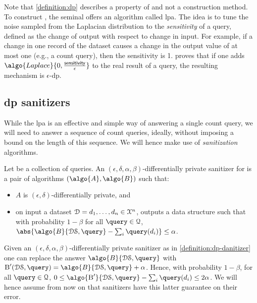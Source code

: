 		Note that \cref{definition:dp} describes a property of  and not a construction method.
		To construct , the seminal \cite{differential-privacy-original} offers an algorithm called \acrfull{lpa}.
		The idea is to tune the noise sampled from the Laplacian distribution to the \emph{sensitivity} of a query, defined as the change of output with respect to change in input.
		For example, if a change in one record of the dataset causes a change in the output value of at most one (e.g., a count query), then the sensitivity is 1.
		\cite{differential-privacy-original} proves that if one adds $\algo{Laplace}{0, \frac{\mathsf{sensitivity}}{\epsilon}}$ to the real result of a query, the resulting mechanism is $\epsilon$-\acrshort{dp}.

		\subsection{\texorpdfstring{\acrshort{dp}}{DP} sanitizers}\label{section:background:dp-sanitizers}

			While the \acrlong{lpa} is an effective and simple way of answering a single count query, we will need to answer a sequence of count queries, ideally, without imposing a bound on the length of this sequence.
			We will hence make use of \emph{sanitization} algorithms.

			\begin{definition}\label{definition:dp-danitizer}
				Let \querySet{} be a collection of queries.
				An $(\epsilon, \delta, \alpha, \beta)$-differentially private sanitizer for \querySet{} is a pair of algorithms $(\algo{A}, \algo{B})$ such that:
				\begin{itemize}
					\item $A$ is $(\epsilon, \delta)$-differentially private, and
					\item on input a dataset $\mathcal{D} = d_1, \ldots, d_{n} \in \mathcal{X}^{n}$,  outputs a data structure \serverDS{} such that with probability $1 - \beta$ for all $\query \in \querySet$, $\abs{ \algo{B}{ \serverDS, \query } - \sum_i \query(d_i) } \leq \alpha$.
				\end{itemize}
			\end{definition}

			\begin{remark}\label{remark:dp-sanitizer-guarantees}
				Given an $(\epsilon, \delta, \alpha, \beta)$-differentially private sanitizer as in \cref{definition:dp-danitizer} one can replace the answer $\algo{B}{ \serverDS, \query }$ with $\textsc{B}^\prime ( \serverDS, \allowbreak \query ) = \algo{B}{ \serverDS, \query } + \alpha$.
				Hence, with probability $1 - \beta$, for all $\query \in \querySet$, $0 \leq \algo{\ensuremath{\textsc{B}^\prime}}{ \serverDS, \query } - \sum_i \query(d_i) \leq 2 \alpha$.
				We will hence assume from now on that sanitizers have this latter guarantee on their error.
			\end{remark}

